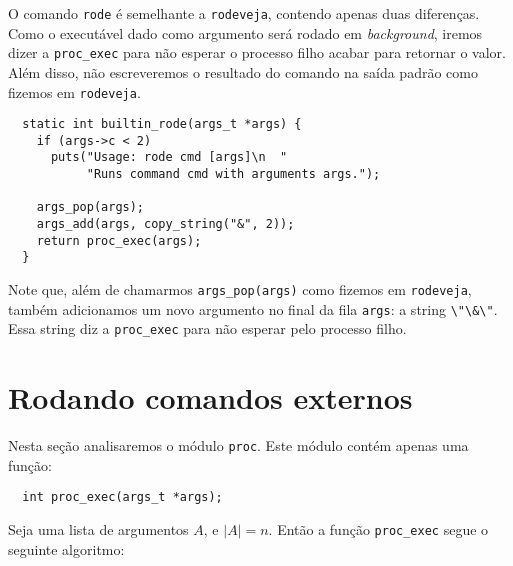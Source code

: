 \documentclass{amsart}
\theoremstyle{plain}
\newcommand{\code}[1]{\lstinline[mathescape=true]{#1}}
\begin{document}
O comando \code{rode} é semelhante a \code{rodeveja}, contendo apenas duas diferenças. Como o
executável dado como argumento será rodado em \textit{background}, iremos dizer a \code{proc_exec}
para não esperar o processo filho acabar para retornar o valor. Além disso, não escreveremos o
resultado do comando na saída padrão como fizemos em \code{rodeveja}.
\newpage
\begin{verbatim}
  static int builtin_rode(args_t *args) {
    if (args->c < 2)
      puts("Usage: rode cmd [args]\n  "
           "Runs command cmd with arguments args.");

    args_pop(args);
    args_add(args, copy_string("&", 2));
    return proc_exec(args);
  }
\end{verbatim}

Note que, além de chamarmos \code{args_pop(args)} como fizemos em \code{rodeveja}, também
adicionamos um novo argumento no final da fila \code{args}: a string \code{\"\&\"}. Essa string
diz a \code{proc_exec} para não esperar pelo processo filho.

\section{Rodando comandos externos}

Nesta seção analisaremos o módulo \code{proc}. Este módulo contém apenas uma função:

\begin{verbatim}
  int proc_exec(args_t *args);
\end{verbatim}

Seja uma lista de argumentos $A$, e $|A|=n$. Então a função \code{proc_exec} segue o seguinte
algoritmo:
\end{document}
